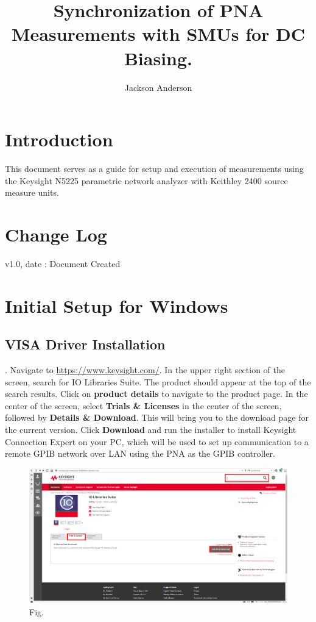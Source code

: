 \documentclass[]{article}
\title{Synchronization of PNA Measurements with SMUs for DC Biasing.}
\author{Jackson Anderson}
\begin{document}
\maketitle


\section{Introduction}
This document serves as a guide for setup and execution of measurements using the Keysight N5225 parametric network analyzer with Keithley 2400 source measure units. 


\section{Change Log}
v1.0, date : Document Created

\newpage
\section{Initial Setup for Windows}

\subsection{VISA Driver Installation}

\ex. Navigate to \url{https://www.keysight.com/}. In the upper right section of the screen, search for IO Libraries Suite. The product should appear at the top of the search results. Click on \textbf{product details} to navigate to the product page. In the center of the screen, select \textbf{Trials \& Licenses} in the center of the screen, followed by \textbf{Details \& Download}. This will bring you to the download page for the current version. Click \textbf{Download} and run the installer to install Keysight Connection Expert on your PC, which will be used to set up communication to a remote GPIB network over LAN using the PNA as the GPIB controller. 

\begin{figure}[H]
	\centering
	\includegraphics[width=\linewidth]{Figures/keysight}
	\caption{Fig.}
	\label{fig:kcon}
\end{figure}
\end{document}

